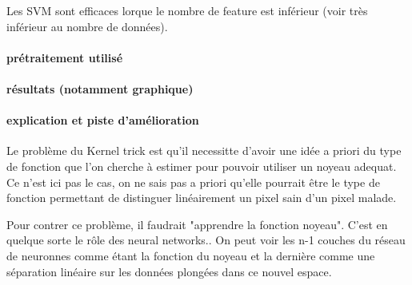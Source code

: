 \documentclass[a4paper,10pt]{report}
\begin{document}
Les SVM sont efficaces lorque le nombre de feature est inférieur (voir très inférieur au nombre de données). 

\paragraph{prétraitement utilisé}
\paragraph{résultats (notamment graphique)}
\paragraph{explication et piste d'amélioration}
Le problème du Kernel trick est qu'il necessitte d'avoir une idée a priori du type de fonction que l'on cherche à estimer pour pouvoir utiliser un noyeau adequat. Ce n'est ici pas le cas, on ne sais pas a priori qu'elle pourrait être le type de fonction permettant de distinguer linéairement un pixel sain d'un pixel malade.

Pour contrer ce problème, il faudrait "apprendre la fonction noyeau". C'est en quelque sorte le rôle des neural networks.. On peut voir les n-1 couches du réseau de neuronnes comme étant la fonction du noyeau et la dernière comme une séparation linéaire sur les données plongées dans ce nouvel espace.
\tableofcontents


\listoffigures
\listoftables
\printindex
\end{document}
